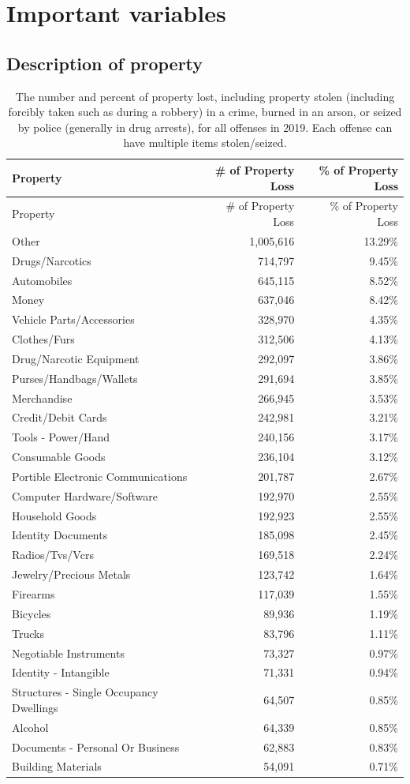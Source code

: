 \documentclass[
  12pt,
  openany]{book}
\begin{document}
\hypertarget{important-variables-5}{%
\section{Important variables}\label{important-variables-5}}

\hypertarget{description-of-property}{%
\subsection{Description of property}\label{description-of-property}}

\begin{longtable}[]{@{}lrr@{}}
\caption{\label{tab:propertyDescription}The number and percent of property lost, including property stolen (including forcibly taken such as during a robbery) in a crime, burned in an arson, or seized by police (generally in drug arrests), for all offenses in 2019. Each offense can have multiple items stolen/seized.}\tabularnewline
\toprule
Property & \# of Property Loss & \% of Property Loss\tabularnewline
\midrule
\endfirsthead
\toprule
Property & \# of Property Loss & \% of Property Loss\tabularnewline
\midrule
\endhead
Other & 1,005,616 & 13.29\%\tabularnewline
Drugs/Narcotics & 714,797 & 9.45\%\tabularnewline
Automobiles & 645,115 & 8.52\%\tabularnewline
Money & 637,046 & 8.42\%\tabularnewline
Vehicle Parts/Accessories & 328,970 & 4.35\%\tabularnewline
Clothes/Furs & 312,506 & 4.13\%\tabularnewline
Drug/Narcotic Equipment & 292,097 & 3.86\%\tabularnewline
Purses/Handbags/Wallets & 291,694 & 3.85\%\tabularnewline
Merchandise & 266,945 & 3.53\%\tabularnewline
Credit/Debit Cards & 242,981 & 3.21\%\tabularnewline
Tools - Power/Hand & 240,156 & 3.17\%\tabularnewline
Consumable Goods & 236,104 & 3.12\%\tabularnewline
Portible Electronic Communications & 201,787 & 2.67\%\tabularnewline
Computer Hardware/Software & 192,970 & 2.55\%\tabularnewline
Household Goods & 192,923 & 2.55\%\tabularnewline
Identity Documents & 185,098 & 2.45\%\tabularnewline
Radios/Tvs/Vcrs & 169,518 & 2.24\%\tabularnewline
Jewelry/Precious Metals & 123,742 & 1.64\%\tabularnewline
Firearms & 117,039 & 1.55\%\tabularnewline
Bicycles & 89,936 & 1.19\%\tabularnewline
Trucks & 83,796 & 1.11\%\tabularnewline
Negotiable Instruments & 73,327 & 0.97\%\tabularnewline
Identity - Intangible & 71,331 & 0.94\%\tabularnewline
Structures - Single Occupancy Dwellings & 64,507 & 0.85\%\tabularnewline
Alcohol & 64,339 & 0.85\%\tabularnewline
Documents - Personal Or Business & 62,883 & 0.83\%\tabularnewline
Building Materials & 54,091 & 0.71\%\tabularnewline

\end{longtable}
\end{document}
